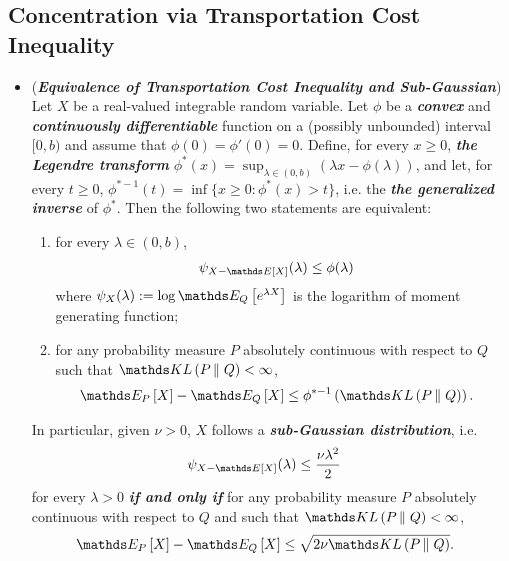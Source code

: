 \documentclass[11pt]{article}
\begin{document}
\subsection{Concentration via Transportation Cost Inequality}
\begin{itemize}
\item \begin{remark} (\textbf{\emph{Equivalence of Transportation Cost Inequality and Sub-Gaussian}}) \citep{boucheron2013concentration} \\
Let $X$ be a real-valued integrable random variable. Let $\phi$ be a \textbf{\emph{convex}} and \textbf{\emph{continuously differentiable}} function on a (possibly unbounded) interval $[0, b)$ and assume that $\phi(0) = \phi'(0) = 0$. Define, for every $x \ge 0$, \textbf{\emph{the Legendre transform}} $\phi^{*}(x) = \sup_{\lambda \in (0,b)}(\lambda x - \phi(\lambda))$, and let, for every $t \ge 0$, $\phi^{*-1}(t) = \inf\{x \ge 0: \phi^{*}(x) > t\}$, i.e. the \textbf{\emph{the generalized inverse}} of $\phi^{*}$. Then the following two statements are equivalent:
\begin{enumerate}
\item for every $\lambda \in (0,b)$,
\begin{align*}
\psi_{X - \E{}{X}}(\lambda) &\le \phi(\lambda)
\end{align*} where $\psi_{X}(\lambda):= \log\E{Q}{e^{\lambda X}}$ is the logarithm of moment generating function;
\item for any probability measure $P$ absolutely continuous with respect to $Q$ such that $\kl{P}{Q} < \infty$,
\begin{align}
\E{P}{X} - \E{Q}{X} &\le \phi^{*-1}\paren{\kl{P}{Q}}. \label{ineqn: information_inequality_general}
\end{align} 
\end{enumerate}
In particular, given $\nu > 0$, $X$ follows a \emph{\textbf{sub-Gaussian distribution}}, i.e.
\begin{align*}
\psi_{X - \E{}{X}}(\lambda) &\le \frac{\nu\lambda^2}{2}
\end{align*} for every $\lambda >0$ \textbf{\emph{if and only if}} for any probability measure $P$ absolutely continuous with respect to $Q$ and such that $\kl{P}{Q} < \infty$, 
\begin{align}
\E{P}{X} - \E{Q}{X} &\le \sqrt{2\nu\kl{P}{Q}}. \label{ineqn: information_inequality_sub_gaussian}
\end{align}
\end{remark}


\end{itemize}
\end{document}
